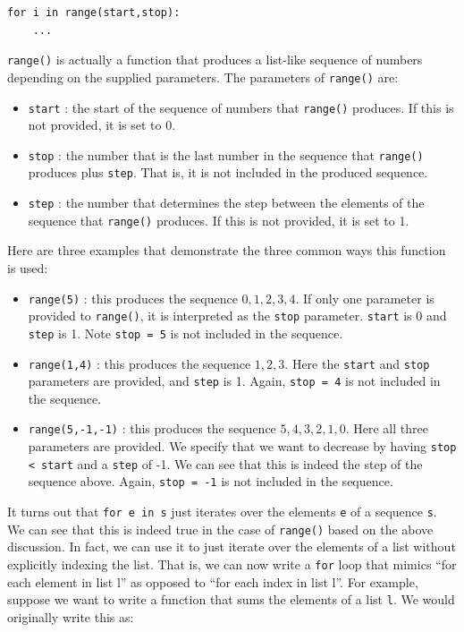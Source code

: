 \documentclass{article}
\begin{document}
\begin{verbatim}
for i in range(start,stop):
    ...
\end{verbatim}
\texttt{range()} is actually a function that produces a list-like sequence of numbers depending on the supplied parameters. The parameters of \texttt{range()} are:

\begin{itemize}
    \item \texttt{start} : the start of the sequence of numbers that \texttt{range()} produces. If this is not provided, it is set to 0.
    \item \texttt{stop} : the number that is the last number in the sequence that \texttt{range()} produces plus \texttt{step}. That is, it is not included in the produced sequence.
    \item \texttt{step} : the number that determines the step between the elements of the sequence that \texttt{range()} produces. If this is not provided, it is set to 1. 
\end{itemize}
Here are three examples that demonstrate the three common ways this function is used:
\begin{itemize}
    \item \texttt{range(5)} : this produces the sequence $0,1,2,3,4$. If only one parameter is provided to \texttt{range()}, it is interpreted as the \texttt{stop} parameter. \texttt{start} is 0 and \texttt{step} is 1. Note \texttt{stop = 5} is not included in the sequence.
    
    \item \texttt{range(1,4)} : this produces the sequence $1,2,3$. Here the \texttt{start} and \texttt{stop} parameters are provided, and \texttt{step} is 1. Again, \texttt{stop = 4} is not included in the sequence.
    
    \item \texttt{range(5,-1,-1)} : this produces the sequence $5,4,3,2,1,0$. Here all three parameters are provided. We specify that we want to decrease by having \texttt{stop < start} and a \texttt{step} of -1. We can see that this is indeed the step of the sequence above. Again, \texttt{stop = -1} is not included in the sequence.
\end{itemize}
It turns out that \texttt{for e in s} just iterates over the elements \texttt{e} of a sequence \texttt{s}. We can see that this is indeed true in the case of \texttt{range()} based on the above discussion. In fact, we can use it to just iterate over the elements of a list without explicitly indexing the list. That is, we can now write a \texttt{for} loop that mimics ``for each element in list l'' as opposed to ``for each index in list l''. For example, suppose we want to write a function that sums the elements of a list \texttt{l}. We would originally write this as:
\end{document}
